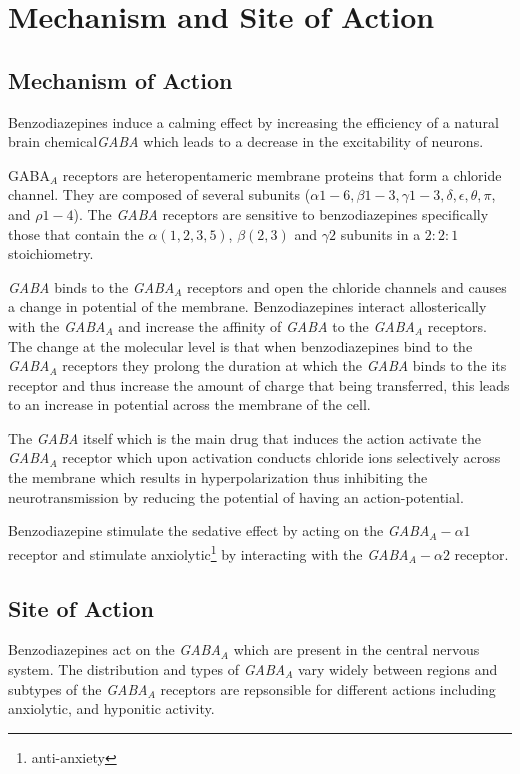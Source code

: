 \chapter{Mechanism and Site of Action}
\section{Mechanism of Action}
Benzodiazepines induce a calming effect by increasing the efficiency of a natural brain chemical\emph{GABA} which leads to a decrease in the excitability of neurons.

GABA$_A$ receptors are heteropentameric membrane proteins that form a chloride channel. They are composed of several subunits ($\alpha 1-6, \beta 1-3, \gamma 1-3, \delta, \epsilon, \theta, \pi$, and $\rho 1-4$). The \emph{GABA} receptors are sensitive to benzodiazepines specifically those that contain the $\alpha(1,2,3,5)$, $\beta(2,3)$ and $\gamma 2$ subunits in a $2:2:1$ stoichiometry.

\emph{GABA} binds to the \emph{GABA$_A$} receptors and open the chloride channels and causes a change in potential of the membrane. Benzodiazepines interact allosterically with the \emph{GABA$_A$} and increase the affinity of \emph{GABA} to the \emph{GABA$_A$} receptors. The change at the molecular level is that when benzodiazepines bind to the \emph{GABA$_A$} receptors they prolong the duration at which the \emph{GABA} binds to the its receptor and thus increase the amount of charge that being transferred, this leads to an increase in potential across the membrane of the cell.


The \emph{GABA} itself which is the main drug that induces the action activate the \emph{GABA$_A$} receptor which upon activation conducts chloride ions selectively across the membrane which results in hyperpolarization thus inhibiting the neurotransmission by reducing the potential of having an action-potential. 

Benzodiazepine stimulate the sedative effect by acting on the \emph{GABA$_A-\alpha 1$} receptor\cite{rudolph1999benzodiazepine} and stimulate anxiolytic\footnote{anti-anxiety} by interacting with the \emph{GABA$_A-\alpha 2$} receptor.\cite{kopp2004modulation} 

\section{Site of Action}
Benzodiazepines act on the \emph{GABA$_A$} which are present in the central nervous system. The distribution and types of \emph{GABA$_A$} vary widely between regions and subtypes of the \emph{GABA$_A$} receptors are repsonsible for different actions including anxiolytic, and hyponitic activity.





